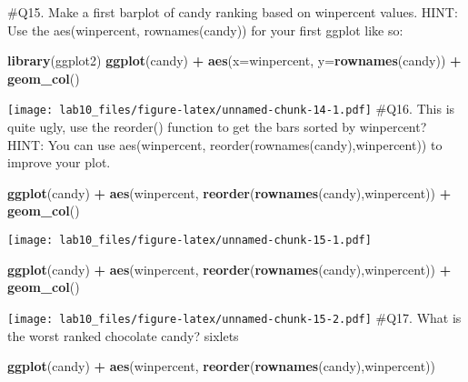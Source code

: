 \documentclass[
]{article}
\newenvironment{Shaded}{\begin{snugshade}}{\end{snugshade}}
\newcommand{\DataTypeTok}[1]{\textcolor[rgb]{0.13,0.29,0.53}{#1}}
\newcommand{\KeywordTok}[1]{\textcolor[rgb]{0.13,0.29,0.53}{\textbf{#1}}}
\newcommand{\NormalTok}[1]{#1}
\newcommand{\OperatorTok}[1]{\textcolor[rgb]{0.81,0.36,0.00}{\textbf{#1}}}
\newcommand{\StringTok}[1]{\textcolor[rgb]{0.31,0.60,0.02}{#1}}
\begin{document}
\#Q15. Make a first barplot of candy ranking based on winpercent values.
HINT: Use the aes(winpercent, rownames(candy)) for your first ggplot
like so:

\begin{Shaded}
\begin{Highlighting}[]
\KeywordTok{library}\NormalTok{(ggplot2) }
\KeywordTok{ggplot}\NormalTok{(candy) }\OperatorTok{+}
\KeywordTok{aes}\NormalTok{(}\DataTypeTok{x=}\NormalTok{winpercent, }\DataTypeTok{y=}\KeywordTok{rownames}\NormalTok{(candy)) }\OperatorTok{+}\StringTok{ }
\StringTok{  }\KeywordTok{geom_col}\NormalTok{()}
\end{Highlighting}
\end{Shaded}

\texttt{[image: lab10\_files/figure-latex/unnamed-chunk-14-1.pdf]} \#Q16.
This is quite ugly, use the reorder() function to get the bars sorted by
winpercent? HINT: You can use aes(winpercent,
reorder(rownames(candy),winpercent)) to improve your plot.

\begin{Shaded}
\begin{Highlighting}[]
\KeywordTok{ggplot}\NormalTok{(candy) }\OperatorTok{+}
\KeywordTok{aes}\NormalTok{(winpercent, }\KeywordTok{reorder}\NormalTok{(}\KeywordTok{rownames}\NormalTok{(candy),winpercent)) }\OperatorTok{+}\StringTok{ }
\StringTok{  }\KeywordTok{geom_col}\NormalTok{()}
\end{Highlighting}
\end{Shaded}

\texttt{[image: lab10\_files/figure-latex/unnamed-chunk-15-1.pdf]}

\begin{Shaded}
\begin{Highlighting}[]
\KeywordTok{ggplot}\NormalTok{(candy) }\OperatorTok{+}
\KeywordTok{aes}\NormalTok{(winpercent, }\KeywordTok{reorder}\NormalTok{(}\KeywordTok{rownames}\NormalTok{(candy),winpercent)) }\OperatorTok{+}\StringTok{ }
\StringTok{  }\KeywordTok{geom_col}\NormalTok{()}
\end{Highlighting}
\end{Shaded}

\texttt{[image: lab10\_files/figure-latex/unnamed-chunk-15-2.pdf]} \#Q17.
What is the worst ranked chocolate candy? sixlets

\begin{Shaded}
\begin{Highlighting}[]
\KeywordTok{ggplot}\NormalTok{(candy) }\OperatorTok{+}
\KeywordTok{aes}\NormalTok{(winpercent, }\KeywordTok{reorder}\NormalTok{(}\KeywordTok{rownames}\NormalTok{(candy),winpercent)) }
\end{Highlighting}
\end{Shaded}
\end{document}
